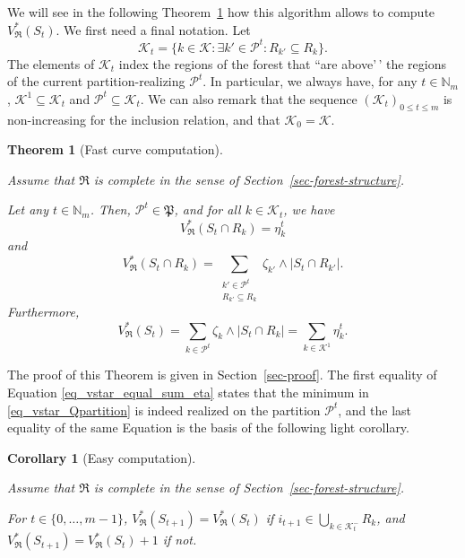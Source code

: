 \documentclass[
  11pt,
  a4paper,
]{article}
\theoremstyle{plain}
\theoremstyle{plain}
\newtheorem{theorem}{Theorem}[section]
\theoremstyle{definition}
\theoremstyle{plain}
\newtheorem{corollary}{Corollary}[section]
\theoremstyle{definition}
\theoremstyle{remark}
\begin{document}
We will see in the following Theorem~\ref{thm-curve-path} how this
algorithm allows to compute \(V^*_{\mathfrak{R}}(S_t)\). We first need a
final notation. Let \begin{equation*}
\mathcal{K}_t=\{k\in\mathcal{K}: \exists k'\in \mathcal{P}^t : R_{k'}\subseteq R_k   \}.
\end{equation*} The elements of \(\mathcal{K}_t\) index the regions of
the forest that ``are above'\,' the regions of the current
partition-realizing \(\mathcal{P}^t\). In particular, we always have,
for any \(t\in\mathbb{N}_m\), \(\mathcal{K}^1\subseteq\mathcal{K}_t\)
and \(\mathcal{P}^t\subseteq \mathcal{K}_t\). We can also remark that
the sequence \((\mathcal{K}_t)_{0\leq t \leq m}\) is non-increasing for
the inclusion relation, and that \(\mathcal{K}_0=\mathcal{K}\).

\begin{theorem}[Fast curve
computation]\protect\hypertarget{thm-curve-path}{}\label{thm-curve-path}

Assume that \(\mathfrak{R}\) is complete in the sense of
Section~\ref{sec-forest-structure}.

Let any \(t\in\mathbb{N}_m\). Then, \(\mathcal{P}^t\in\mathfrak P\), and
for all \(k\in\mathcal{K}_t\), we have \begin{equation}
V^*_{\mathfrak{R}}(S_t\cap R_k) = \eta_k^t
\label{eq_vstar_inter_Rk_equal_eta}
\end{equation} and \begin{equation}
V^*_{\mathfrak{R}}(S_t\cap R_k) = \sum_{\substack{k'\in \mathcal{P}^t\\ R_{k'}\subseteq R_k}} \zeta_{k'}\wedge|S_t \cap R_{k'}|.
\label{eq_Pt_good_partition}
\end{equation} Furthermore, \begin{equation}
V^*_{\mathfrak{R}}(S_t)  = \sum_{{k\in \mathcal{P}^t}} \zeta_{k}\wedge|S_t \cap R_{k}|= \sum_{k\in\mathcal{K}^1} \eta_k^t.
\label{eq_vstar_equal_sum_eta}
\end{equation}

\end{theorem}

The proof of this Theorem is given in Section~\ref{sec-proof}. The first
equality of Equation \eqref{eq_vstar_equal_sum_eta} states that the
minimum in \eqref{eq_vstar_Qpartition} is indeed realized on the
partition \(\mathcal{P}^t\), and the last equality of the same Equation
is the basis of the following light corollary.

\begin{corollary}[Easy
computation]\protect\hypertarget{cor-easy-impl}{}\label{cor-easy-impl}

Assume that \(\mathfrak{R}\) is complete in the sense of
Section~\ref{sec-forest-structure}.

For \(t\in\{0,\dotsc, m-1 \}\),
\(V^*_{\mathfrak{R}}(S_{t+1})=V^*_{\mathfrak{R}}(S_{t})\) if
\(i_{t+1}\in \bigcup_{k\in\mathcal{K}^-_t}R_k\), and
\(V^*_{\mathfrak{R}}(S_{t+1})=V^*_{\mathfrak{R}}(S_{t}) + 1\) if not.

\end{corollary}
\end{document}
